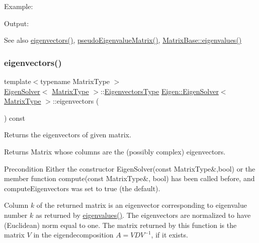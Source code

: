 Example\+: 
\begin{DoxyCodeInclude}{0}
\end{DoxyCodeInclude}
 Output\+: 
\begin{DoxyVerbInclude}
\end{DoxyVerbInclude}


\begin{DoxySeeAlso}{See also}
\mbox{\hyperlink{class_eigen_1_1_eigen_solver_a66288022802172e3ee059283b26201d7}{eigenvectors()}}, \mbox{\hyperlink{class_eigen_1_1_eigen_solver_a4979eafe0aeef06b19ada7fa5e19db17}{pseudo\+Eigenvalue\+Matrix()}}, \mbox{\hyperlink{class_eigen_1_1_matrix_base_a30430fa3d5b4e74d312fd4f502ac984d}{Matrix\+Base\+::eigenvalues()}} 
\end{DoxySeeAlso}
\mbox{\label{class_eigen_1_1_eigen_solver_a66288022802172e3ee059283b26201d7}} 
\subsubsection{\texorpdfstring{eigenvectors()}{eigenvectors()}}
{\footnotesize\ttfamily template$<$typename Matrix\+Type $>$ \\
\mbox{\hyperlink{class_eigen_1_1_eigen_solver}{Eigen\+Solver}}$<$ \mbox{\hyperlink{class_eigen_1_1_eigen_solver_a83acd180404ddaac8a678fa65a6b632b}{Matrix\+Type}} $>$\+::\mbox{\hyperlink{class_eigen_1_1_eigen_solver_aa140354e2f7d5ce34c6488c39e19f2c2}{Eigenvectors\+Type}} \mbox{\hyperlink{class_eigen_1_1_eigen_solver}{Eigen\+::\+Eigen\+Solver}}$<$ \mbox{\hyperlink{class_eigen_1_1_eigen_solver_a83acd180404ddaac8a678fa65a6b632b}{Matrix\+Type}} $>$\+::eigenvectors (\begin{DoxyParamCaption}{ }\end{DoxyParamCaption}) const}



Returns the eigenvectors of given matrix. 

\begin{DoxyReturn}{Returns}
Matrix whose columns are the (possibly complex) eigenvectors.
\end{DoxyReturn}
\begin{DoxyPrecond}{Precondition}
Either the constructor Eigen\+Solver(const Matrix\+Type\&,bool) or the member function compute(const Matrix\+Type\&, bool) has been called before, and {\ttfamily compute\+Eigenvectors} was set to true (the default).
\end{DoxyPrecond}
Column $ k $ of the returned matrix is an eigenvector corresponding to eigenvalue number $ k $ as returned by \mbox{\hyperlink{class_eigen_1_1_eigen_solver_a114189009e42f5e03372a7a3dfa33b97}{eigenvalues()}}. The eigenvectors are normalized to have (Euclidean) norm equal to one. The matrix returned by this function is the matrix $ V $ in the eigendecomposition $ A = V D V^{-1} $, if it exists.

